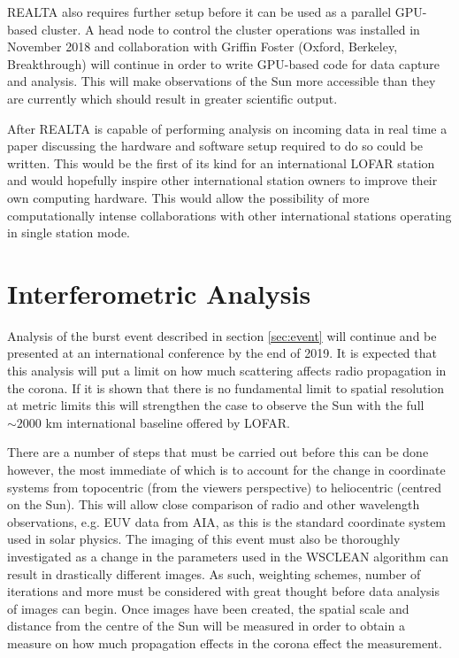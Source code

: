 REALTA also requires further setup before it can be used as a parallel GPU-based cluster. A head node to control the cluster operations was installed in November 2018 and collaboration with Griffin Foster (Oxford, Berkeley, Breakthrough) will continue in order to write GPU-based code for data capture and analysis. This will make observations of the Sun more accessible than they are currently which should result in greater scientific output.

After REALTA is capable of performing analysis on incoming data in real time a paper discussing the hardware and software setup required to do so could be written. This would be the first of its kind for an international LOFAR station and would hopefully inspire other international station owners to improve their own computing hardware. This would allow the possibility of more computationally intense collaborations with other international stations operating in single station mode.

\section{Interferometric Analysis}
Analysis of the burst event described in section \ref{sec:event} will continue and be presented at an international conference by the end of 2019. It is expected that this analysis will put a limit on how much scattering affects radio propagation in the corona. If it is shown that there is no fundamental limit to spatial resolution at metric limits this will strengthen the case to observe the Sun with the full $\sim 2000$ km international baseline offered by LOFAR.

There are a number of steps that must be carried out before this can be done however, the most immediate of which is to account for the change in coordinate systems from topocentric (from the viewers perspective) to heliocentric (centred on the Sun). This will allow close comparison of radio and other wavelength observations, e.g. EUV data from AIA, as this is the standard coordinate system used in solar physics.
The imaging of this event must also be thoroughly investigated as a change in the parameters used in the WSCLEAN algorithm can result in drastically different images. As such, weighting schemes, number of iterations and more must be considered with great thought before data analysis of images can begin.
Once images have been created, the spatial scale and distance from the centre of the Sun will be measured in order to obtain a measure on how much propagation effects in the corona effect the measurement.

